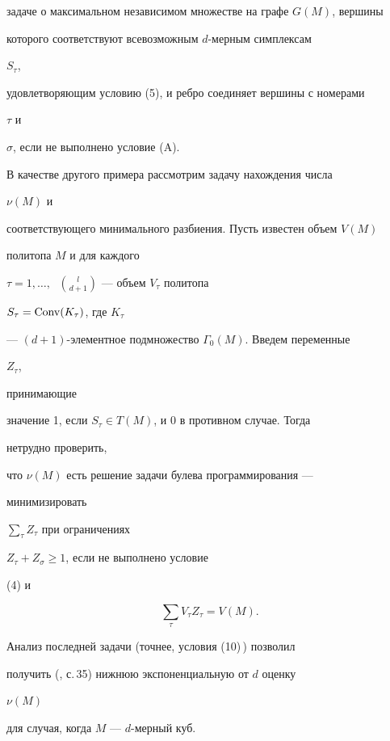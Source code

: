 задаче о максимальном независимом множестве на графе $G(M)$, вершины


которого соответствуют всевозможным $d$-мерным симплексам


$S_\tau$,


удовлетворяющим условию (5), и ребро соединяет вершины с номерами


$\tau$ и


$\sigma$, если не выполнено условие (A).





В качестве другого примера рассмотрим задачу нахождения числа


$\nu(M)$ и


соответствующего минимального разбиения. Пусть известен объем $V(M)$


политопа $M$ и для каждого


$\tau=1,\dotsc,\;$ $\binom{l}{d+1}$ --- объем $V_\tau$ политопа


$S_\tau=\operatorname{Conv}(K_\tau)$, где $K_\tau$


--- $(d+1)$-элементное подмножество $\Gamma_0(M)$. Введем переменные


$Z_\tau$,


принимающие


значение 1, если $S_\tau\in T(M)$, и 0 в противном случае. Тогда


нетрудно проверить,


что $\nu(M)$ есть решение задачи булева программирования ---


минимизировать


$\sum\limits_\tau Z_\tau$ при ограничениях


$Z_\tau+Z_\sigma\ge 1$, если не выполнено условие


(4) и


\begin{equation}


\sum_\tau V_\tau Z_\tau=V(M).


\end{equation}





Анализ последней задачи (точнее, условия (10)\,) позволил


получить (\cite{S1}, с.\,35) нижнюю экспоненциальную от $d$ оценку


$\nu(M)$


для случая, когда $M$ --- $d$-мерный куб.





